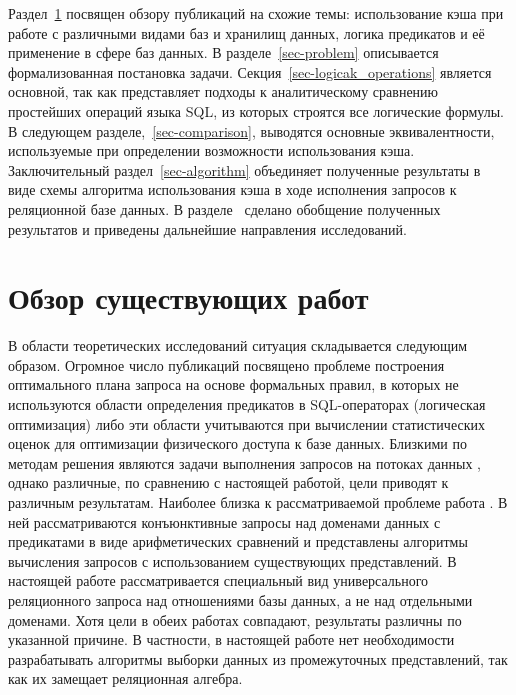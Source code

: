 \documentclass{cmi}
\begin{document}
Раздел~\ref{sec-overview} посвящен обзору публикаций на схожие темы: использование кэша при работе с различными видами баз и хранилищ данных, логика предикатов и её применение в сфере баз данных. В разделе~\ref{sec-problem} описывается формализованная постановка задачи. Секция~\ref{sec-logicak_operations} является основной, так как представляет подходы к аналитическому сравнению простейших операций языка SQL, из которых строятся все логические формулы. В следующем разделе,~\ref{sec-comparison}, выводятся основные эквивалентности, используемые при определении возможности использования кэша. Заключительный раздел~\ref{sec-algorithm} объединяет полученные результаты в виде схемы алгоритма использования кэша в ходе исполнения запросов к реляционной базе данных. В разделе~ сделано обобщение полученных результатов и приведены дальнейшие направления исследований.

\section{Обзор существующих работ}
\label{sec-overview}
В области теоретических исследований ситуация складывается следующим образом. Огромное число публикаций посвящено проблеме построения оптимального плана запроса на основе формальных правил, в которых не используются области определения предикатов в SQL-операторах (логическая оптимизация) либо эти области учитываются при вычислении статистических оценок для оптимизации физического доступа к базе данных. Близкими по методам решения являются задачи выполнения запросов на потоках данных \cite{olston, denny}, однако различные, по сравнению с настоящей работой, цели приводят к различным результатам. Наиболее близка к рассматриваемой проблеме работа \cite{afrati}. В ней рассматриваются конъюнктивные запросы над доменами данных с предикатами в виде арифметических сравнений и представлены алгоритмы вычисления запросов с использованием существующих представлений. В настоящей работе рассматривается специальный вид универсального реляционного запроса над отношениями базы данных, а не над отдельными доменами. Хотя цели в обеих работах совпадают, результаты различны по указанной причине. В частности, в настоящей работе нет необходимости разрабатывать алгоритмы выборки данных из промежуточных представлений, так как их замещает реляционная алгебра.
\end{document}
